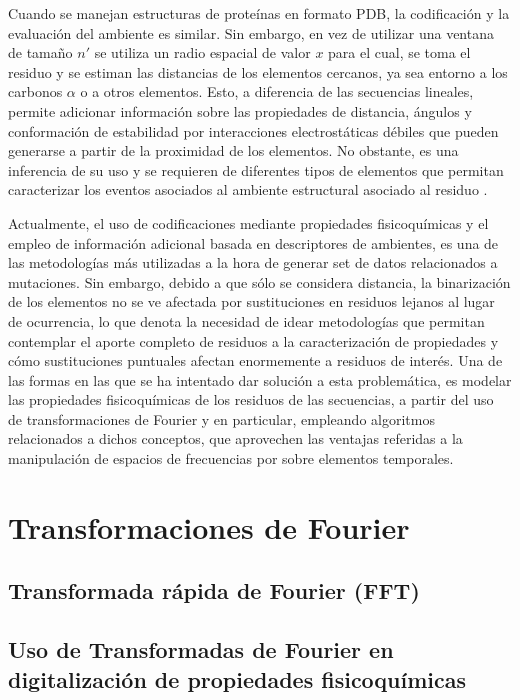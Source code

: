 Cuando se manejan estructuras de proteínas en formato PDB, la codificación y la evaluación del ambiente es similar. Sin embargo, en vez de utilizar una ventana de tamaño $n'$ se utiliza un radio espacial de valor $x$ para el cual, se toma el residuo y se estiman las distancias de los elementos cercanos, ya sea entorno a los carbonos $\alpha$ o a otros elementos. Esto, a diferencia de las secuencias lineales, permite adicionar información sobre las propiedades de distancia, ángulos y conformación de estabilidad por interacciones electrostáticas débiles que pueden generarse a partir de la proximidad de los elementos. No obstante, es una inferencia de su uso y se requieren de diferentes tipos de elementos que permitan caracterizar los eventos asociados al ambiente estructural asociado al residuo \cite{capriotti2008three}.

Actualmente, el uso de codificaciones mediante propiedades fisicoquímicas y el empleo de información adicional basada en descriptores de ambientes, es una de las metodologías más utilizadas a la hora de generar set de datos relacionados a mutaciones. Sin embargo, debido a que sólo se considera distancia, la binarización de los elementos no se ve afectada por sustituciones en residuos lejanos al lugar de ocurrencia, lo que denota la necesidad de idear metodologías que permitan contemplar el aporte completo de residuos a la caracterización de propiedades y cómo sustituciones puntuales afectan enormemente a residuos de interés. Una de las formas en las que se ha intentado dar solución a esta problemática, es modelar las propiedades fisicoquímicas de los residuos de las secuencias, a partir del uso de transformaciones de Fourier y en particular, empleando algoritmos relacionados a dichos conceptos, que aprovechen las ventajas referidas a la manipulación de espacios de frecuencias por sobre elementos temporales.

\section{Transformaciones de Fourier}

\subsection{Transformada rápida de Fourier (FFT)}

\subsection{Uso de Transformadas de Fourier en digitalización de propiedades fisicoquímicas}


